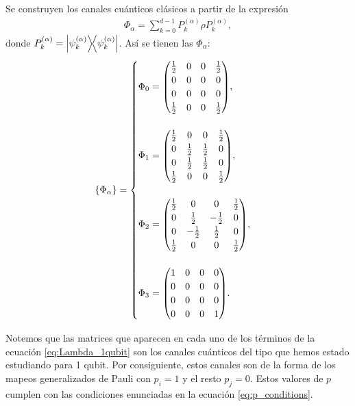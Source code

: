 \documentclass[11pt,letterpaper]{article}
\begin{document}
Se construyen los canales cuánticos clásicos a partir de la expresión
\begin{align}
	\Phi _{\alpha} = \sum_{k=0}^{d-1} P_k^{(\alpha)}\rho P_k^{(\alpha)},
\end{align}
donde $P_k^{(\alpha)} = \dyad{\psi_k^{(\alpha)}}{\psi_k^{(\alpha)}}$. Así se tienen las $\Phi _{\alpha}$:
\begin{equation}
\{ \Phi _{\alpha} \}= 
\begin{cases}
\Phi _0 = \mqty(\frac{1}{2} & 0 & 0 & \frac{1}{2}\\ 0 & 0 & 0 & 0\\ 0 & 0 & 0 & 0\\ \frac{1}{2} & 0 & 0 & \frac{1}{2}), \\
\\
\Phi _1 = \mqty(\frac{1}{2} & 0 & 0 & \frac{1}{2}\\ 0 & \frac{1}{2} & \frac{1}{2} & 0\\ 0 & \frac{1}{2} & \frac{1}{2} & 0\\ \frac{1}{2} & 0 & 0 & \frac{1}{2}), \\
\\
\Phi _2 = \mqty(\frac{1}{2} & 0 & 0 & \frac{1}{2}\\ 0 & \frac{1}{2} & -\frac{1}{2} & 0\\ 0 & -\frac{1}{2} & \frac{1}{2} & 0\\ \frac{1}{2} & 0 & 0 & \frac{1}{2}), \\
\\
\Phi _3 = \mqty(1 & 0 & 0 & 0\\ 0 & 0 & 0 & 0\\ 0 & 0 & 0 & 0\\ 0 & 0 & 0 & 1). \\
\end{cases}
\label{eq:Phi_alphas-1qubit}
\end{equation}

Notemos que las matrices que aparecen en cada uno de los términos de la ecuación \eqref{eq:Lambda_1qubit} son los canales cuánticos del tipo que hemos estado estudiando para 1 qubit. Por consiguiente, estos canales son de la forma de los mapeos generalizados de Pauli con $p_i=1$ y el resto $p_j=0$. Estos valores de $p$ cumplen con las condiciones enunciadas en la ecuación \eqref{eq:p_conditions}.




	
	
\end{document}
